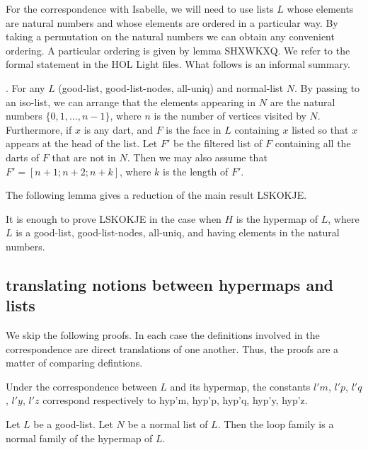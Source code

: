 For the correspondence with Isabelle, we will need to use lists $L$ whose elements are natural numbers and
whose elements are ordered in a particular way.  By taking a permutation on the natural numbers we can obtain
any convenient ordering.  A particular ordering is given by lemma SHXWKXQ.  We refer to the formal statement
in the HOL Light files.  What follows is an informal summary.

\begin{lemma}.  For any $L$ (good-list, good-list-nodes, all-uniq)
and normal-list $N$.  By passing to an iso-list, we can arrange that the elements appearing
in $N$ are the natural numbers $\{0,1,\ldots,n-1\}$, where $n$ is the number of vertices visited by $N$.
Furthermore, if $x$ is any dart, and $F$ is the face in $L$ containing $x$ listed so that $x$ appears at the head of the
list.  Let $F'$ be the filtered list of $F$ containing all the darts of $F$ that are not in $N$.  Then we may also assume that
$F' = [n+1;n+2;n+k]$, where $k$ is the length of $F'$.
\end{lemma}

The following lemma gives a reduction of the main result LSKOKJE.

\begin{lemma}[JCAJYDU]  It is enough to prove LSKOKJE in the case when $H$ is the hypermap of $L$,
where $L$ is a good-list, good-list-nodes, all-uniq, and having elements in the natural numbers.
\end{lemma}


\subsection{translating notions between hypermaps and lists}


We skip the following proofs.  In each case the definitions involved in the correspondence
are direct translations of one another.  Thus, the proofs are a matter of comparing defintions.

\begin{lemma} Under the correspondence between $L$ and its hypermap, the constants
$l'm$, $l'p$, $l'q$, $l'y$, $l'z$ correspond respectively to hyp'm, hyp'p, hyp'q, hyp'y, hyp'z.
\end{lemma}

\begin{lemma} Let $L$ be a good-list.  Let $N$ be a normal list of $L$.
Then the loop family is a normal family of the hypermap of $L$.  
\end{lemma}

